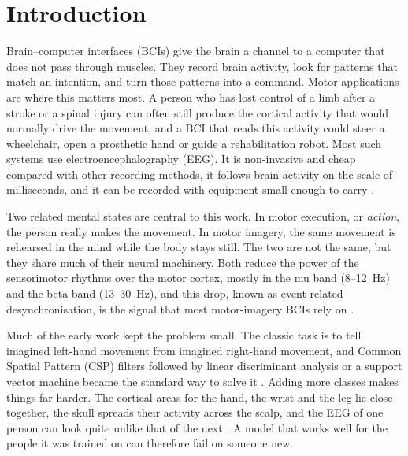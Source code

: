 \documentclass[pdflatex,sn-mathphys-num]{sn-jnl}%
\theoremstyle{thmstyleone}%
\theoremstyle{thmstyletwo}%
\theoremstyle{thmstylethree}%
\begin{document}

\maketitle

\section{Introduction}\label{sec1}

Brain--computer interfaces (BCIs) give the brain a channel to a computer that does not pass through muscles. They record brain activity, look for patterns that match an intention, and turn those patterns into a command. Motor applications are where this matters most. A person who has lost control of a limb after a stroke or a spinal injury can often still produce the cortical activity that would normally drive the movement, and a BCI that reads this activity could steer a wheelchair, open a prosthetic hand or guide a rehabilitation robot. Most such systems use electroencephalography (EEG). It is non-invasive and cheap compared with other recording methods, it follows brain activity on the scale of milliseconds, and it can be recorded with equipment small enough to carry \citep{Wolpaw2002,NicolasAlonso2012}.

Two related mental states are central to this work. In motor execution, or \emph{action}, the person really makes the movement. In motor imagery, the same movement is rehearsed in the mind while the body stays still. The two are not the same, but they share much of their neural machinery. Both reduce the power of the sensorimotor rhythms over the motor cortex, mostly in the mu band (8--12~Hz) and the beta band (13--30~Hz), and this drop, known as event-related desynchronisation, is the signal that most motor-imagery BCIs rely on \citep{Pfurtscheller2001,PfurtschellerAranibar1977}.

Much of the early work kept the problem small. The classic task is to tell imagined left-hand movement from imagined right-hand movement, and Common Spatial Pattern (CSP) filters followed by linear discriminant analysis or a support vector machine became the standard way to solve it \citep{Ramoser2000,Blankertz2008}. Adding more classes makes things far harder. The cortical areas for the hand, the wrist and the leg lie close together, the skull spreads their activity across the scalp, and the EEG of one person can look quite unlike that of the next \citep{Naeem2006,Lotte2018}. A model that works well for the people it was trained on can therefore fail on someone new.
\end{document}
